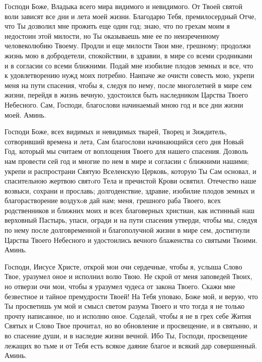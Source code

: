 Господи Боже, Владыка всего мира видимого и невидимого. От Твоей святой воли зависят все дни и лета моей жизни. Благодарю Тебя, премилосердный Отче, что Ты дозволил мне прожить еще один год; знаю, что по грехам моим я недостоин этой милости, но Ты оказываешь мне ее по неизреченному человеколюбию Твоему. Продли и еще милости Твои мне, грешному; продолжи жизнь мою в добродетели, спокойствии, в здравии, в мире со всеми сродниками и в согласии со всеми ближними. Подай мне изобилие плодов земных и все, что к удовлетворению нужд моих потребно. Наипаче же очисти совесть мою, укрепи меня на пути спасения, чтобы я, следуя по нему, после многолетней в мире сем жизни, перейдя в жизнь вечную, удостоился быть наследником Царства Твоего Небесного. Сам, Господи, благослови начинаемый мною год и все дни жизни моей. Аминь.


\mychapterending





Господи Боже, всех видимых и невидимых тварей, Творец и Зиждитель, сотворивший времена и лета, Сам благослови начинающийся сего дня Новый Год, который мы считаем от воплощения Твоего для нашего спасения. Дозволь нам провести сей год и многие по нем в мире и согласии с ближними нашими; укрепи и распространи Святую Вселенскую Церковь, которую Ты Сам основал, и спасительною жертвою святoго Тела и пречистой Крови освятил. Отечество наше возвыси, сохрани и прославь; долгоденствие, здравие, изобилие плодов земных и благорастворение воздухoв дай нам; меня, грешного раба Твоего, всех родственников и ближних моих и всех благоверных христиан, как истинный наш верховный Пастырь, упаси, огради и на пути спасения утверди, чтобы мы, следуя по нему после долговременной и благополучной жизни в мире сем, достигнули Царства Твоего Небесного и удостоились вечного блаженства со святыми Твоими. Аминь.


\mychapterending





Господи, Иисусе Христе, открой мои очи сердечные, чтобы я, услыша Слово Твое, уразумел оное и исполнил волю Твою. Не скрой от меня заповедей Твоих, но отверзи очи мои, чтобы я уразумел чудеса от закона Твоего. Скажи мне безвестное и тайное премудрости Твоей! На Тебя уповаю, Боже мой, и верую, что Ты просветишь ум мой и смысл светом разума Твоего и что тогда я не только прочту написанное, но и исполню оное. Соделай, чтобы я не в грех себе Жития Святых и Слово Твое прочитал, но во обновление и просвещение, и в святыню, и во спасение души, и в наследие жизни вечной. Ибо Ты, Господи, просвещение лежащих во тьме и от Тебя есть всякое даяние благое и всякий дар совершенный. Аминь.


